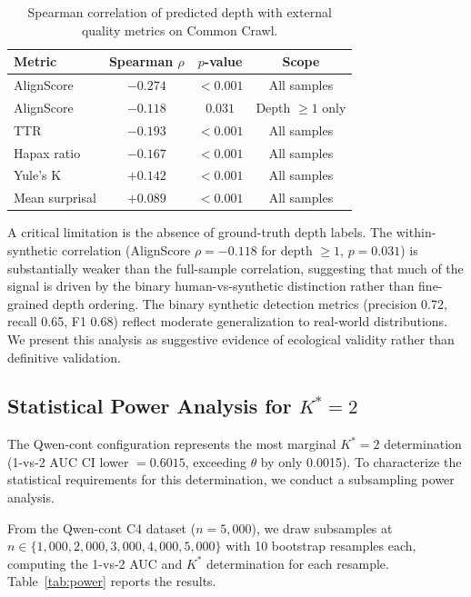 \documentclass[11pt,a4paper]{article}
\newcommand{\Kstar}{K^{*}}
\begin{document}
\begin{table}[t]
\centering
\caption{Spearman correlation of predicted depth with external quality metrics on Common Crawl.}
\label{tab:cc_corr}
\small
\begin{tabular}{lccc}
\toprule
\textbf{Metric} & \textbf{Spearman $\rho$} & \textbf{$p$-value} & \textbf{Scope} \\
\midrule
AlignScore     & $-0.274$ & $< 0.001$ & All samples \\
AlignScore     & $-0.118$ & $0.031$   & Depth $\geq 1$ only \\
TTR            & $-0.193$ & $< 0.001$ & All samples \\
Hapax ratio    & $-0.167$ & $< 0.001$ & All samples \\
Yule's K       & $+0.142$ & $< 0.001$ & All samples \\
Mean surprisal & $+0.089$ & $< 0.001$ & All samples \\
\bottomrule
\end{tabular}
\end{table}

A critical limitation is the absence of ground-truth depth labels. The within-synthetic correlation (AlignScore $\rho = -0.118$ for depth $\geq 1$, $p = 0.031$) is substantially weaker than the full-sample correlation, suggesting that much of the signal is driven by the binary human-vs-synthetic distinction rather than fine-grained depth ordering. The binary synthetic detection metrics (precision 0.72, recall 0.65, F1 0.68) reflect moderate generalization to real-world distributions. We present this analysis as suggestive evidence of ecological validity rather than definitive validation.

\subsection{Statistical Power Analysis for $\Kstar = 2$}
\label{sec:power}

The Qwen-cont configuration represents the most marginal $\Kstar = 2$ determination (1-vs-2 AUC CI lower $= 0.6015$, exceeding $\theta$ by only 0.0015). To characterize the statistical requirements for this determination, we conduct a subsampling power analysis.

From the Qwen-cont C4 dataset ($n = 5{,}000$), we draw subsamples at $n \in \{1{,}000, 2{,}000, 3{,}000, 4{,}000, 5{,}000\}$ with 10 bootstrap resamples each, computing the 1-vs-2 AUC and $\Kstar$ determination for each resample. Table~\ref{tab:power} reports the results.
\end{document}
